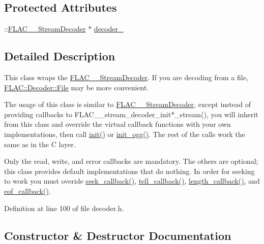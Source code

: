 \subsection*{Protected Attributes}
\begin{DoxyCompactItemize}
\item 
\+::\hyperlink{struct_f_l_a_c_____stream_decoder}{F\+L\+A\+C\+\_\+\+\_\+\+Stream\+Decoder} $\ast$ \hyperlink{class_f_l_a_c_1_1_decoder_1_1_stream_a61f72b653d6171edaf5e7cdf916b98aa}{decoder\+\_\+}
\end{DoxyCompactItemize}


\subsection{Detailed Description}
This class wraps the \hyperlink{struct_f_l_a_c_____stream_decoder}{F\+L\+A\+C\+\_\+\+\_\+\+Stream\+Decoder}. If you are decoding from a file, \hyperlink{class_f_l_a_c_1_1_decoder_1_1_file}{F\+L\+A\+C\+::\+Decoder\+::\+File} may be more convenient. 

The usage of this class is similar to \hyperlink{struct_f_l_a_c_____stream_decoder}{F\+L\+A\+C\+\_\+\+\_\+\+Stream\+Decoder}, except instead of providing callbacks to F\+L\+A\+C\+\_\+\+\_\+stream\+\_\+decoder\+\_\+init$\ast$\+\_\+stream(), you will inherit from this class and override the virtual callback functions with your own implementations, then call \hyperlink{class_f_l_a_c_1_1_decoder_1_1_stream_a5267433117fbed17e11498856d881335}{init()} or \hyperlink{class_f_l_a_c_1_1_decoder_1_1_stream_a5dcd3a0ed3192a793d058e6d270078ed}{init\+\_\+ogg()}. The rest of the calls work the same as in the C layer.

Only the read, write, and error callbacks are mandatory. The others are optional; this class provides default implementations that do nothing. In order for seeking to work you must overide \hyperlink{class_f_l_a_c_1_1_decoder_1_1_stream_a159620053a7ae9fbe2d61ec5bf31ea9d}{seek\+\_\+callback()}, \hyperlink{class_f_l_a_c_1_1_decoder_1_1_stream_ab7766b9c46c504963188d14c713e0178}{tell\+\_\+callback()}, \hyperlink{class_f_l_a_c_1_1_decoder_1_1_stream_acaf2fe0f12ccb3b0ed12adccc095e5e3}{length\+\_\+callback()}, and \hyperlink{class_f_l_a_c_1_1_decoder_1_1_stream_adfe8736f74fcc1d18374d74d34995353}{eof\+\_\+callback()}. 

Definition at line 100 of file decoder.\+h.



\subsection{Constructor \& Destructor Documentation}
